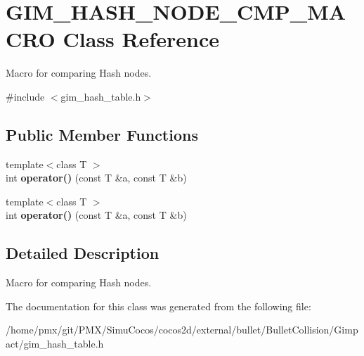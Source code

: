 \hypertarget{classGIM__HASH__NODE__CMP__MACRO}{}\section{G\+I\+M\+\_\+\+H\+A\+S\+H\+\_\+\+N\+O\+D\+E\+\_\+\+C\+M\+P\+\_\+\+M\+A\+C\+RO Class Reference}
\label{classGIM__HASH__NODE__CMP__MACRO}


Macro for comparing Hash nodes.  




{\ttfamily \#include $<$gim\+\_\+hash\+\_\+table.\+h$>$}

\subsection*{Public Member Functions}
\begin{DoxyCompactItemize}
\item 
\mbox{\label{classGIM__HASH__NODE__CMP__MACRO_ad25bf1672cd10f35957c0dcb72738f7c}} 
{\footnotesize template$<$class T $>$ }\\int {\bfseries operator()} (const T \&a, const T \&b)
\item 
\mbox{\label{classGIM__HASH__NODE__CMP__MACRO_ad25bf1672cd10f35957c0dcb72738f7c}} 
{\footnotesize template$<$class T $>$ }\\int {\bfseries operator()} (const T \&a, const T \&b)
\end{DoxyCompactItemize}


\subsection{Detailed Description}
Macro for comparing Hash nodes. 

The documentation for this class was generated from the following file\+:\begin{DoxyCompactItemize}
\item 
/home/pmx/git/\+P\+M\+X/\+Simu\+Cocos/cocos2d/external/bullet/\+Bullet\+Collision/\+Gimpact/gim\+\_\+hash\+\_\+table.\+h\end{DoxyCompactItemize}
